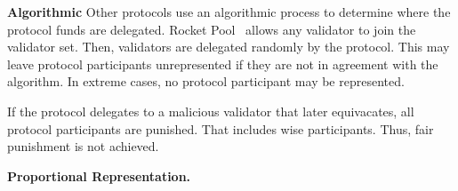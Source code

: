 \textbf{Algorithmic}
Other protocols use an algorithmic process to determine
where the protocol funds are delegated. Rocket Pool~\cite{rocketpool} %
allows any validator to join the validator set. Then,
validators are delegated randomly by the protocol.
This may leave protocol participants unrepresented if they are not in
agreement with the algorithm. In extreme cases, no protocol participant may be
represented.

If the protocol delegates to a malicious validator that later equivacates,
all protocol participants are punished. That includes wise participants. Thus,
fair punishment is not achieved.


\textbf{Proportional Representation.}











